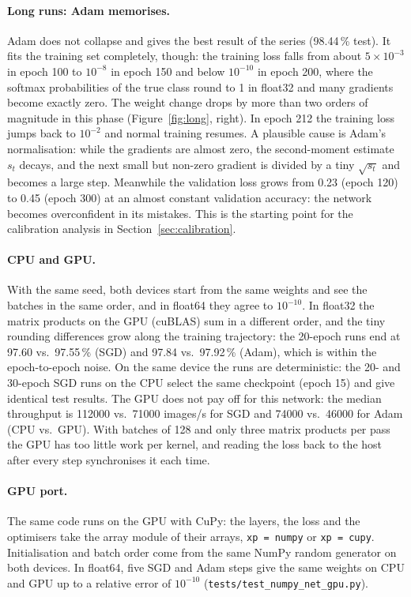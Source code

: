 \documentclass[11pt,a4paper]{article}
\newcommand{\1}{\mathbf{1}}
\begin{document}
\paragraph{Long runs: Adam memorises.} Adam does not collapse and gives the best result of the
series (98.44\,\% test). It fits the training set completely, though: the training loss falls
from about $5 \times 10^{-3}$ in epoch 100 to $10^{-8}$ in epoch 150 and below $10^{-10}$ in epoch
200, where the softmax probabilities of the true class round to 1 in float32 and many gradients
become exactly zero. The weight change drops by more than two orders of magnitude in this phase
(Figure~\ref{fig:long}, right). In epoch 212 the training loss jumps back to $10^{-2}$ and normal
training resumes. A plausible cause is Adam's normalisation: while the gradients are almost zero,
the second-moment estimate $s_t$ decays, and the next small but non-zero gradient is divided by
a tiny $\sqrt{s_t}$ and becomes a large step. Meanwhile the validation loss grows from 0.23
(epoch 120) to 0.45 (epoch 300) at an almost constant validation accuracy: the network becomes
overconfident in its mistakes. This is the starting point for the calibration analysis in
Section~\ref{sec:calibration}.

\paragraph{CPU and GPU.} With the same seed, both devices start from the same weights and see
the batches in the same order, and in float64 they agree to $10^{-10}$. In float32 the matrix
products on the GPU (cuBLAS) sum in a different order, and the tiny rounding differences grow
along the training trajectory: the 20-epoch runs end at 97.60 vs.\ 97.55\,\% (SGD) and 97.84
vs.\ 97.92\,\% (Adam), which is within the epoch-to-epoch noise. On the same device the runs
are deterministic: the 20- and 30-epoch SGD runs on the CPU select the same checkpoint (epoch
15) and give identical test results. The GPU does not pay off for this network: the median
throughput is \num{112000} vs.\ \num{71000} images/s for SGD and \num{74000} vs.\ \num{46000}
for Adam (CPU vs.\ GPU). With batches of 128 and only three matrix products per pass the GPU has
too little work per kernel, and reading the loss back to the host after every step synchronises
it each time.

\paragraph{GPU port.} The same code runs on the GPU with CuPy: the layers, the loss and the
optimisers take the array module of their arrays, \texttt{xp = numpy} or \texttt{xp = cupy}.
Initialisation and batch order come from the same NumPy random generator on both devices. In
float64, five SGD and Adam steps give the same weights on CPU and GPU up to a relative error of
$10^{-10}$ (\texttt{tests/test\_numpy\_net\_gpu.py}).
\end{document}
